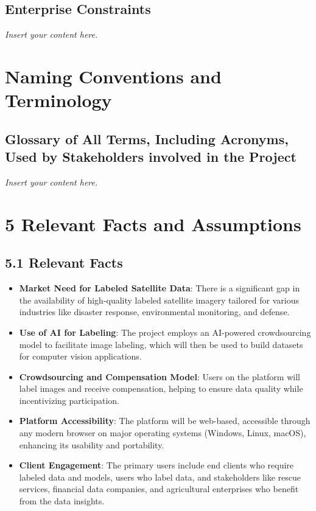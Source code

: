 \documentclass[12pt]{article}
\newcommand{\lips}{\textit{Insert your content here.}}
\begin{document}
\subsection{Enterprise Constraints}
\lips

\section{Naming Conventions and Terminology}
\subsection{Glossary of All Terms, Including Acronyms, Used by Stakeholders
involved in the Project}
\lips

\section*{5 Relevant Facts and Assumptions}

\subsection*{5.1 Relevant Facts}
\begin{itemize}[leftmargin=2cm]
    \item \textbf{Market Need for Labeled Satellite Data}: There is a significant gap in the availability of high-quality labeled satellite imagery tailored for various industries like disaster response, environmental monitoring, and defense.
    \item \textbf{Use of AI for Labeling}: The project employs an AI-powered crowdsourcing model to facilitate image labeling, which will then be used to build datasets for computer vision applications.
    \item \textbf{Crowdsourcing and Compensation Model}: Users on the platform will label images and receive compensation, helping to ensure data quality while incentivizing participation.
    \item \textbf{Platform Accessibility}: The platform will be web-based, accessible through any modern browser on major operating systems (Windows, Linux, macOS), enhancing its usability and portability.
    \item \textbf{Client Engagement}: The primary users include end clients who require labeled data and models, users who label data, and stakeholders like rescue services, financial data companies, and agricultural enterprises who benefit from the data insights.
\end{itemize}
\end{document}
